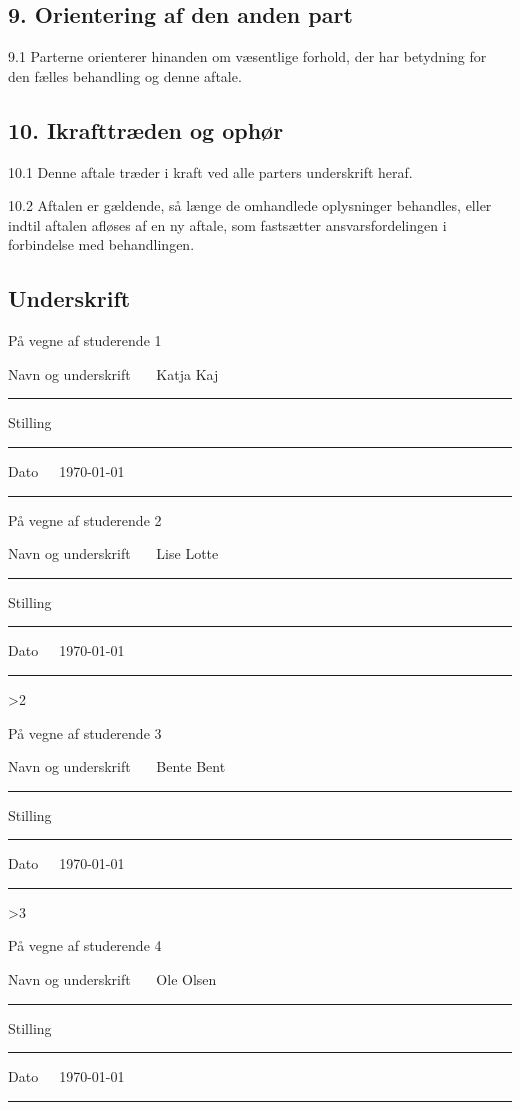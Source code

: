 \documentclass[11pt, a4paper]{article}
\newcommand{\studerendeET}{ Katja Kaj }	 		%
\newcommand{\studerendeTO}{ Lise Lotte }	 		%
\newcommand{\studerendeTRE}{ Bente Bent }	 		%
\newcommand{\studerendeFIRE}{ Ole Olsen }	 	%
\newcounter{number_of_students}
\begin{document}
\subsection*{9. Orientering af den anden part}

9.1 Parterne orienterer hinanden om væsentlige forhold, der har betydning for den fælles behandling og denne aftale.

\subsection*{10. Ikrafttræden og ophør}

10.1 Denne aftale træder i kraft ved alle parters underskrift heraf.

10.2 Aftalen er gældende, så længe de omhandlede oplysninger behandles, eller indtil aftalen afløses af en ny aftale, som fastsætter ansvarsfordelingen i forbindelse med behandlingen.




\subsection*{Underskrift}

På vegne af studerende 1

Navn og underskrift~~~\studerendeET
\vspace{1mm}
\hrule
\vspace{5mm}
Stilling~~~
\vspace{1mm}
\hrule
\vspace{5mm}
Dato~~~\today
\vspace{1mm}
\hrule

\vspace{5mm}
På vegne af studerende 2

Navn og underskrift~~~\studerendeTO
\vspace{1mm}
\hrule
\vspace{5mm}
Stilling~~~
\vspace{1mm}
\hrule
\vspace{5mm}
Dato~~~\today
\vspace{1mm}
\hrule

\ifnum \value{number_of_students}>2 {
\vspace{5mm}
På vegne af studerende 3

Navn og underskrift~~~\studerendeTRE
\vspace{1mm}
\hrule
\vspace{5mm}
Stilling~~~
\vspace{1mm}
\hrule
\vspace{5mm}
Dato~~~\today
\vspace{1mm}
\hrule
} 
\fi

\ifnum \value{number_of_students}>3 {
\vspace{5mm}
På vegne af studerende 4

Navn og underskrift~~~\studerendeFIRE
\vspace{1mm}
\hrule
\vspace{5mm}
Stilling~~~
\vspace{1mm}
\hrule
\vspace{5mm}
Dato~~~\today
\vspace{1mm}
\hrule
}
\fi
\end{document}

